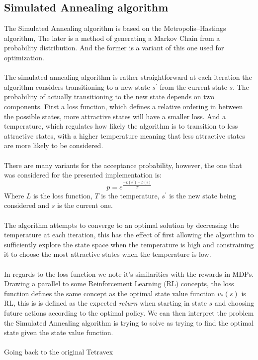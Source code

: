 \documentclass[11pt]{article}
\begin{document}
\begin{multicols*}{2}
\subsection{Simulated Annealing algorithm}
The Simulated Annealing algorithm is based on the Metropolis–Hastings algorithm,
The later is a method of generating a Markov Chain from a probability
distribution. And the former is a variant of this one used for optimization.\\\\
The simulated annealing algorithm is rather straightforward at each iteration the
algorithm considers transitioning to a new state $s^\prime$ from the current
state $s$. The probability of actually transitioning to the new state depends on
two components. First a loss function, which defines a relative ordering in
between the possible states, more attractive states will have a smaller
loss. And a temperature, which regulates how likely the algorithm is to
transition to less attractive states, with a higher temperature meaning that
less attractive states are more likely to be considered.\\\\
There are many variants for the acceptance probability, however, the one that
was considered for the presented implementation is:
\begin{equation}
  p = e^\frac{-L(s^\prime) - L(s)}{T}
\end{equation}
Where $L$ is the loss function, $T$ is the temperature, $s^\prime$ is the new
state being considered and $s$ is the current one.\\\\ The algorithm attempts to
converge to an optimal solution by decreasing the temperature at each iteration,
this has the effect of first allowing the algorithm to sufficiently explore the
state space when the temperature is high and constraining it to choose the most
attractive states when the temperature is low.\\\\ In regards to the loss
function we note it's similarities with the rewards in MDPs. Drawing a parallel
to some Reinforcement Learning (RL) concepts, the loss function defines the same
concept as the optimal state value function $v_*(s)$ is RL, this is is defined
as the expected \textit{return} when starting in state $s$ and choosing future
actions according to the optimal policy. We can then interpret the problem the
Simulated Annealing algorithm is trying to solve as trying to find the optimal
state given the state value function.\\\\ Going back to the original Tetravex

\end{multicols*}
\end{document}
